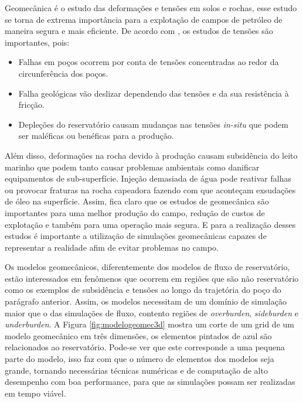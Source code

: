 

Geomecânica é o estudo das deformações e tensões em solos e rochas, esse estudo se torna de extrema importância para a explotação de campos de petróleo de maneira segura e mais eficiente. De acordo com \citet{ResGeomec}, os estudos de tensões são importantes, pois:

\begin{itemize}
    \item Falhas em poços ocorrem por conta de tensões concentradas ao redor da circunferência dos poços.
    \item Falha geológicas vão deslizar dependendo das tensões e da sua resistência à fricção. 
    \item Depleções do reservatório causam mudanças nas tensões \textit{in-situ} que podem ser maléficas ou benéficas para a produção.
\end{itemize}

Além disso, deformações na rocha devido à produção causam subsidência do leito marinho que podem tanto causar problemas ambientais como danificar equipamentos de sub-superfície. Injeção demasiada de água  pode reativar falhas ou provocar fraturas na rocha capeadora fazendo com que aconteçam exsudações de óleo na superfície. Assim, fica claro que os estudos de geomecânica são importantes para uma melhor produção do campo, redução de custos de explotação e também para uma operação mais segura.  E para a realização desses estudos é importante a utilização de simulações geomecânicas capazes de representar a realidade afim de evitar problemas no campo.

Os modelos geomecânicos, diferentemente dos modelos de fluxo de reservatório, estão interessados em fenômenos que ocorrem em regiões que são não reservatório como os exemplos de subsidência e tensões ao longo da trajetória do poço do parágrafo anterior. Assim, os modelos necessitam de um domínio de simulação maior que o das simulações de fluxo, contento regiões de \textit{overburden}, \textit{sideburden} e \textit{underburden}. A Figura \ref{fig:modelogeomec3d} mostra um corte de um grid de um modelo geomecânico em três dimensões, os elementos pintados de azul são relacionados ao reservatório. Pode-se ver que este corresponde a uma pequena parte do modelo, isso faz com que o número de elementos dos  modelos seja grande, tornando necessárias técnicas numéricas e de computação de alto desempenho com boa performance, para que as simulações possam ser realizadas em tempo viável. 


